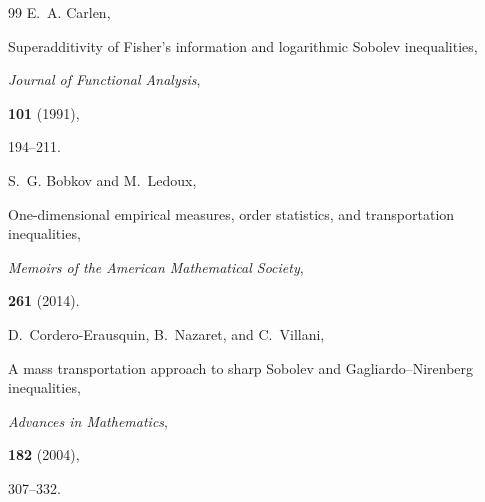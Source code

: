 \documentclass[11pt]{amsart}
\begin{document}
\begin{thebibliography}{99}
E.~A. Carlen,

\newblock
Superadditivity of Fisher's information and logarithmic Sobolev
inequalities,

\newblock
\emph{Journal of Functional Analysis},

\textbf{101} (1991),

194--211.




S.~G. Bobkov and M.~Ledoux,

\newblock
One-dimensional empirical measures, order statistics, and
transportation inequalities,

\newblock
\emph{Memoirs of the American Mathematical Society},

\textbf{261} (2014).




D.~Cordero-Erausquin, B.~Nazaret, and C.~Villani,

\newblock
A mass transportation approach to sharp Sobolev and
Gagliardo--Nirenberg inequalities,

\newblock
\emph{Advances in Mathematics},

\textbf{182} (2004),

307--332.



\end{thebibliography}

\fi
\end{document}
